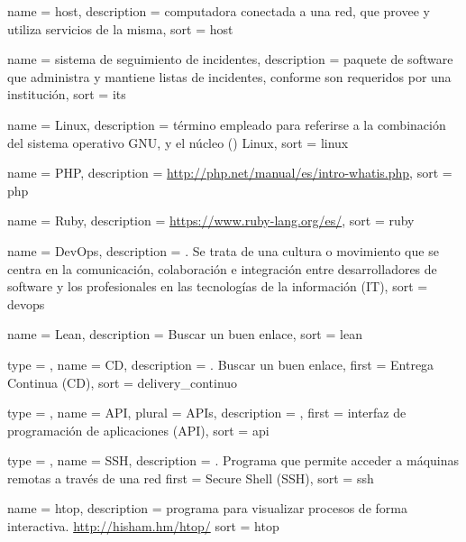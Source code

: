  {
  name        = {host},
  description =
    {computadora conectada a una red, que provee y utiliza servicios de la misma},
  sort        = {host}
}

 {
  name        = {sistema de seguimiento de incidentes},
  description =
    {paquete de software que administra y mantiene listas de incidentes,
    conforme son requeridos por una institución},
  sort        = {its}
}

 {
  name        = {Linux},
  description =
    {término empleado para referirse a la combinación del sistema operativo
    GNU, y el núcleo () Linux},
  sort        = {linux}
}

 {
  name        = {PHP},
  description =
    {
    \url{http://php.net/manual/es/intro-whatis.php}},
  sort        = {php}
}

 {
  name        = {Ruby},
  description = {\url{https://www.ruby-lang.org/es/}},
  sort        = {ruby}
}

 {
  name        = {DevOps},
  description =
    {. Se trata de una cultura o movimiento que se
    centra en la comunicación, colaboración e integración entre desarrolladores
    de software y los profesionales en las tecnologías de la información
    (IT)},
  sort        = {devops}
}

 {
  name        = {Lean},
  description = {Buscar un buen enlace},
  sort        = {lean}
}

 {
  type        = \acronymtype,
  name        = {CD},
  description = {. Buscar un buen enlace},
  first       = {Entrega Continua (CD)},
  sort        = {delivery_continuo}
}

 {
  type        = \acronymtype,
  name        = {API},
  plural      = {APIs},
  description = {},
  first       = {interfaz de programación de aplicaciones (API)},
  sort        = {api}
}

 {
  type        = \acronymtype,
  name        = {SSH},
  description =
    {. Programa que permite acceder a máquinas remotas a
    través de una red}
  first       = {Secure Shell (SSH)},
  sort        = {ssh}
}

 {
  name        = {htop},
  description =
    {programa para visualizar procesos de forma interactiva.
    \url{http://hisham.hm/htop/}}
  sort        = {htop}
}

